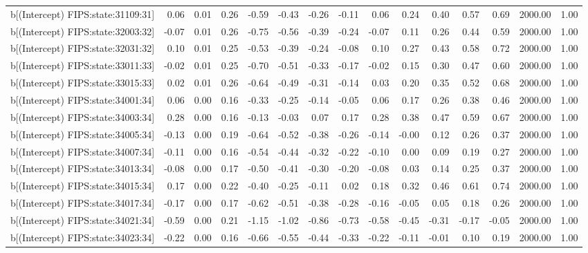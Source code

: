 \begin{table}[ht]
\begin{tabular}{rrrrrrrrrrrrrrr}
  b[(Intercept) FIPS:state:31109:31] & 0.06 & 0.01 & 0.26 & -0.59 & -0.43 & -0.26 & -0.11 & 0.06 & 0.24 & 0.40 & 0.57 & 0.69 & 2000.00 & 1.00 \\ 
  b[(Intercept) FIPS:state:32003:32] & -0.07 & 0.01 & 0.26 & -0.75 & -0.56 & -0.39 & -0.24 & -0.07 & 0.11 & 0.26 & 0.44 & 0.59 & 2000.00 & 1.00 \\ 
  b[(Intercept) FIPS:state:32031:32] & 0.10 & 0.01 & 0.25 & -0.53 & -0.39 & -0.24 & -0.08 & 0.10 & 0.27 & 0.43 & 0.58 & 0.72 & 2000.00 & 1.00 \\ 
  b[(Intercept) FIPS:state:33011:33] & -0.02 & 0.01 & 0.25 & -0.70 & -0.51 & -0.33 & -0.17 & -0.02 & 0.15 & 0.30 & 0.47 & 0.60 & 2000.00 & 1.00 \\ 
  b[(Intercept) FIPS:state:33015:33] & 0.02 & 0.01 & 0.26 & -0.64 & -0.49 & -0.31 & -0.14 & 0.03 & 0.20 & 0.35 & 0.52 & 0.68 & 2000.00 & 1.00 \\ 
  b[(Intercept) FIPS:state:34001:34] & 0.06 & 0.00 & 0.16 & -0.33 & -0.25 & -0.14 & -0.05 & 0.06 & 0.17 & 0.26 & 0.38 & 0.46 & 2000.00 & 1.00 \\ 
  b[(Intercept) FIPS:state:34003:34] & 0.28 & 0.00 & 0.16 & -0.13 & -0.03 & 0.07 & 0.17 & 0.28 & 0.38 & 0.47 & 0.59 & 0.67 & 2000.00 & 1.00 \\ 
  b[(Intercept) FIPS:state:34005:34] & -0.13 & 0.00 & 0.19 & -0.64 & -0.52 & -0.38 & -0.26 & -0.14 & -0.00 & 0.12 & 0.26 & 0.37 & 2000.00 & 1.00 \\ 
  b[(Intercept) FIPS:state:34007:34] & -0.11 & 0.00 & 0.16 & -0.54 & -0.44 & -0.32 & -0.22 & -0.10 & 0.00 & 0.09 & 0.19 & 0.27 & 2000.00 & 1.00 \\ 
  b[(Intercept) FIPS:state:34013:34] & -0.08 & 0.00 & 0.17 & -0.50 & -0.41 & -0.30 & -0.20 & -0.08 & 0.03 & 0.14 & 0.25 & 0.37 & 2000.00 & 1.00 \\ 
  b[(Intercept) FIPS:state:34015:34] & 0.17 & 0.00 & 0.22 & -0.40 & -0.25 & -0.11 & 0.02 & 0.18 & 0.32 & 0.46 & 0.61 & 0.74 & 2000.00 & 1.00 \\ 
  b[(Intercept) FIPS:state:34017:34] & -0.17 & 0.00 & 0.17 & -0.62 & -0.51 & -0.38 & -0.28 & -0.16 & -0.05 & 0.05 & 0.18 & 0.26 & 2000.00 & 1.00 \\ 
  b[(Intercept) FIPS:state:34021:34] & -0.59 & 0.00 & 0.21 & -1.15 & -1.02 & -0.86 & -0.73 & -0.58 & -0.45 & -0.31 & -0.17 & -0.05 & 2000.00 & 1.00 \\ 
  b[(Intercept) FIPS:state:34023:34] & -0.22 & 0.00 & 0.16 & -0.66 & -0.55 & -0.44 & -0.33 & -0.22 & -0.11 & -0.01 & 0.10 & 0.19 & 2000.00 & 1.00 \\ 

\end{tabular}
\end{table}
